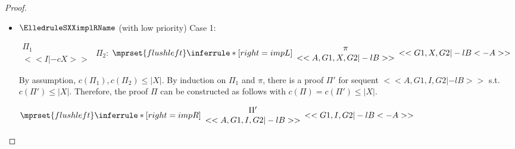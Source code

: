 \begin{proof}
\begin{enumerate}
\begin{itemize}
  \item $\ElledruleSXXimplRName$ (with low priority) Case 1:
      \begin{center}
        \scriptsize
        \begin{math}
          \begin{array}{c}
            \Pi_1 \\
            {<<I |-c X>>}
          \end{array}
        \end{math}
        \qquad\qquad
        $\Pi_2$:
        \begin{math}
          $$\mprset{flushleft}
          \inferrule* [right={\tiny impL}] {
            {
              \begin{array}{c}
                \pi \\
                {<<A, G1, X, G2|-l B>>}
              \end{array}
            }
          }{<<G1, X, G2 |-l B <- A>>}
        \end{math}
      \end{center}
      By assumption, $c(\Pi_1),c(\Pi_2)\leq |X|$. By induction on $\Pi_1$ and $\pi$, there
      is a proof $\Pi'$ for sequent $<<A, G1, I, G2 |-l B>>$ s.t. $c(\Pi') \leq |X|$.
      Therefore, the proof $\Pi$ can be constructed as follows with
      $c(\Pi) = c(\Pi') \leq |X|$.
      \begin{center}
        \scriptsize
        \begin{math}
          $$\mprset{flushleft}
          \inferrule* [right={\tiny impR}] {
            {
              \begin{array}{c}
                \Pi' \\
                {<<A, G1, I, G2 |-l B>>}
              \end{array}
            }
          }{<<G1, I, G2 |-l B <- A>>}
        \end{math}
      \end{center}


\end{itemize}
\end{enumerate}
\end{proof}
